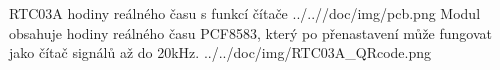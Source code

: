 \uvod
{RTC03A}
{hodiny reálného času s funkcí čítače}
{}
{../..//doc/img/pcb.png}
{Modul obsahuje hodiny reálného času PCF8583, který po přenastavení může fungovat jako čítač signálů až do 20kHz.}
{ }
{../../doc/img/RTC03A_QRcode.png}